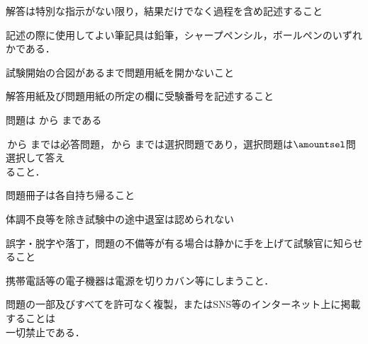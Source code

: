 \item\;  解答は特別な指示がない限り，結果だけでなく過程を含め記述すること
\item\;  記述の際に使用してよい筆記具は鉛筆，シャープペンシル，ボールペンのいずれかである．
\item\;  試験開始の合図があるまで問題用紙を開かないこと
\item\;  解答用紙及び問題用紙の所定の欄に受験番号を記述すること
\item\;  問題は\,\,から\,\fbox{\amountq}\,まである
\item\;  \fbox{\hreq}\,から\,\fbox{\ereq}\,までは必答問題，\fbox{\hselect}\,から\,\fbox{\eselect}\,までは選択問題であり，選択問題は$\amountsel$問選択して答え\\[2mm]
         \hspace{0.2cm}ること．
\item\;  問題冊子は各自持ち帰ること
\item\;  体調不良等を除き試験中の途中退室は認められない
\item\;  誤字・脱字や落丁，問題の不備等が有る場合は静かに手を上げて試験官に知らせること
\item\;  携帯電話等の電子機器は電源を切りカバン等にしまうこと．
\item\;  問題の一部及びすべてを許可なく複製，またはSNS等のインターネット上に掲載することは\\[2mm]
         \hspace{0.2cm}一切禁止である．